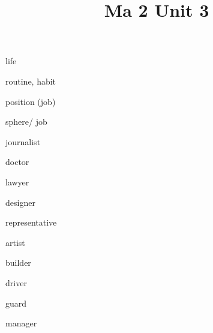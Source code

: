 \documentclass[avery5371,grid,frame]{flashcards}
\title{Ma 2 Unit 3}
\begin{document}
\begin{flashcard}{\LARGE life}
\LARGE {}
\end{flashcard}
\begin{flashcard}{\LARGE routine, habit}
\LARGE {}
\end{flashcard}
\begin{flashcard}{\LARGE position (job)}
\LARGE {}
\end{flashcard}
\begin{flashcard}{\LARGE sphere/ job}
\LARGE {}
\end{flashcard}
\begin{flashcard}{\LARGE journalist}
\LARGE {}
\end{flashcard}
\begin{flashcard}{\LARGE doctor}
\LARGE {}
\end{flashcard}
\begin{flashcard}{\LARGE lawyer}
\LARGE {}
\end{flashcard}
\begin{flashcard}{\LARGE designer}
\LARGE {}
\end{flashcard}
\begin{flashcard}{\LARGE representative}
\LARGE {}
\end{flashcard}
\begin{flashcard}{\LARGE artist}
\LARGE {}
\end{flashcard}
\begin{flashcard}{\LARGE builder}
\LARGE {}
\end{flashcard}
\begin{flashcard}{\LARGE driver}
\LARGE {}
\end{flashcard}
\begin{flashcard}{\LARGE guard}
\LARGE {}
\end{flashcard}
\begin{flashcard}{\LARGE manager}
\LARGE {}
\end{flashcard}
\end{document}
